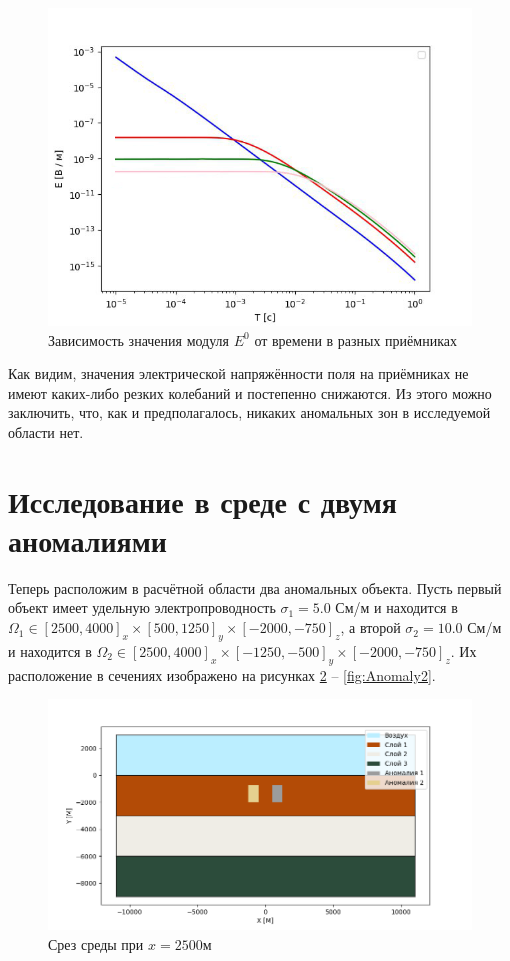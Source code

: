 \begin{figure}
	\centering
	\vspace*{0.7cm}
	\includegraphics[width=1.0\linewidth]{images/Log_E.png}
	\caption{Зависимость значения модуля $E^0$ от времени в разных приёмниках}
	\label{fig:LogE}
\end{figure} 

Как видим, значения электрической напряжённости поля на приёмниках не имеют каких-либо резких колебаний и постепенно снижаются. Из этого можно заключить, что, как и предполагалось, никаких аномальных зон в исследуемой области нет. 

\section{Исследование в среде с двумя аномалиями}

Теперь расположим в расчётной области два аномальных объекта. Пусть первый объект имеет удельную электропроводность $\sigma_1 = 5.0$ См/м и находится в $\Omega_1 \in [2500, 4000]_x \times [500, 1250]_y \times [-2000, -750]_z$, а второй $\sigma_2 = 10.0$ См/м и находится в $\Omega_2 \in [2500, 4000]_x \times [-1250, -500]_y \times [-2000, -750]_z$. Их расположение в сечениях изображено на рисунках \ref{fig:Anomaly1} -- \ref{fig:Anomaly2}.  

\begin{figure}
	\centering
	\vspace*{0.7cm}
	\includegraphics[width=0.8\linewidth]{images/Anomalies_1.png}
	\caption{Срез среды при $x = 2500$м}
	\label{fig:Anomaly1}
\end{figure}


